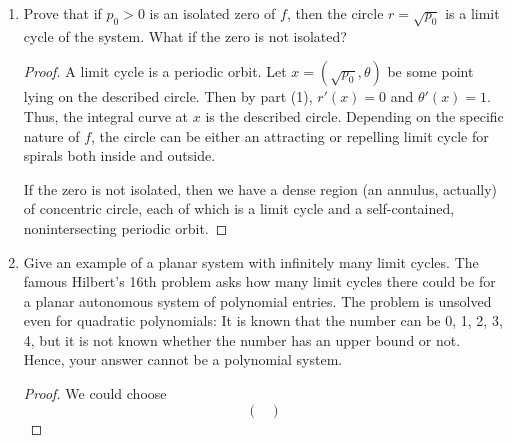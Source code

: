 \documentclass[../psets.tex]{subfiles}
\begin{document}
\begin{enumerate}
\begin{enumerate}
\begin{proof}
            This yields as our final answer
            \begin{equation*}
                \boxed{
                    {
                        \begin{pmatrix}
                            r\\
                            \theta\\
                        \end{pmatrix}'
                        =
                        \begin{pmatrix}
                            rf(r^2)\\
                            1\\
                        \end{pmatrix}
                    }
                }
            \end{equation*}
        \end{proof}
        \item Prove that if $p_0>0$ is an isolated zero of $f$, then the circle $r=\sqrt{p_0}$ is a limit cycle of the system. What if the zero is not isolated?
        \begin{proof}
            A limit cycle is a periodic orbit. Let $x=(\sqrt{p_0},\theta)$ be some point lying on the described circle. Then by part (1), $r'(x)=0$ and $\theta'(x)=1$. Thus, the integral curve at $x$ is the described circle. Depending on the specific nature of $f$, the circle can be either an attracting or repelling limit cycle for spirals both inside and outside.\par
            If the zero is not isolated, then we have a dense region (an annulus, actually) of concentric circle, each of which is a limit cycle and a self-contained, nonintersecting periodic orbit.
        \end{proof}
        \item Give an example of a planar system with infinitely many limit cycles. The famous Hilbert's 16th problem asks how many limit cycles there could be for a planar autonomous system of polynomial entries. The problem is unsolved even for quadratic polynomials: It is known that the number can be 0, 1, 2, 3, 4, but it is not known whether the number has an upper bound or not. Hence, your answer cannot be a polynomial system.
        \begin{proof}
            We could choose
            \begin{equation*}
                \boxed{
                    {
                        \begin{pmatrix}

\end{pmatrix}}}
\end{equation*}
\end{proof}
\end{enumerate}
\end{enumerate}
\end{document}
